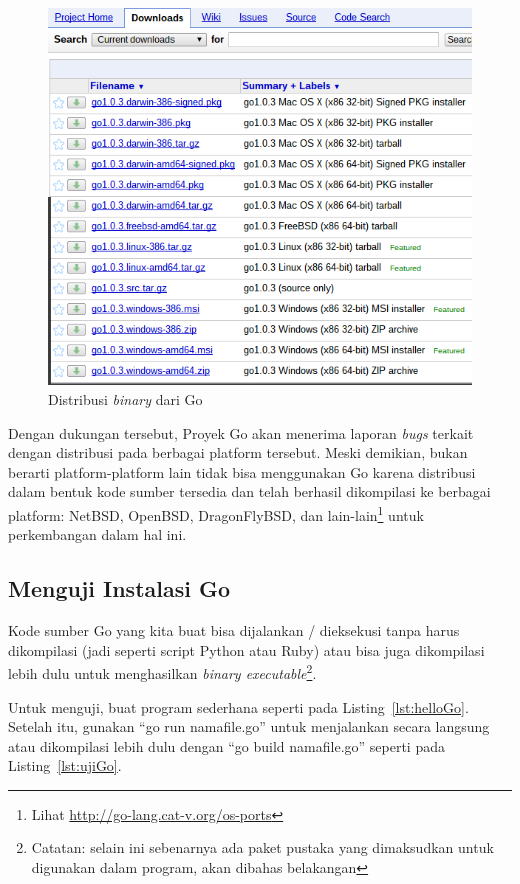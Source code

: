   \begin{figure}
    \begin{center}
      \includegraphics[scale=0.5]{images/download-go.png}
    \end{center}
		\caption{Distribusi \textit{binary} dari Go}
    \label{fig:downloadGo}
  \end{figure}

	Dengan dukungan tersebut, Proyek Go akan menerima laporan \textit{bugs} terkait dengan distribusi pada berbagai platform tersebut. Meski demikian, bukan berarti platform-platform lain tidak bisa menggunakan Go karena distribusi dalam bentuk kode sumber tersedia dan telah berhasil dikompilasi ke berbagai platform: NetBSD, OpenBSD, DragonFlyBSD, dan lain-lain\footnote{Lihat \url{http://go-lang.cat-v.org/os-ports}} untuk perkembangan dalam hal ini.


\subsection{Menguji Instalasi Go}

Kode sumber Go yang kita buat bisa dijalankan / dieksekusi tanpa harus dikompilasi (jadi seperti script Python atau Ruby) atau bisa juga dikompilasi lebih dulu untuk menghasilkan \textit{binary executable}\footnote{Catatan: selain ini sebenarnya ada paket pustaka yang dimaksudkan untuk digunakan dalam program, akan dibahas belakangan}. 

Untuk menguji, buat program sederhana seperti pada Listing~\ref{lst:helloGo}. Setelah itu, gunakan ``go run namafile.go'' untuk menjalankan secara langsung atau dikompilasi lebih dulu dengan ``go build namafile.go'' seperti pada Listing~\ref{lst:ujiGo}.
	
